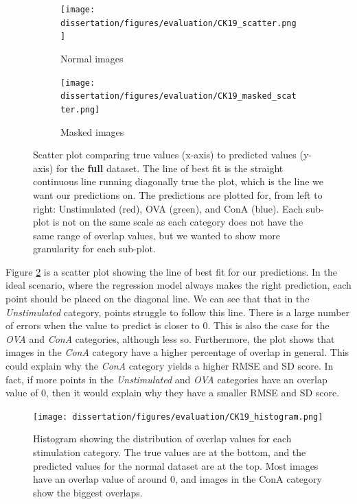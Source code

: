 \begin{figure}[h!]
    \centering
    \begin{subfigure}{.8\textwidth}
        \texttt{[image: dissertation/figures/evaluation/CK19\_scatter.png]}
        \caption{Normal images}
    \end{subfigure}
    \begin{subfigure}{.8\textwidth}
        \texttt{[image: dissertation/figures/evaluation/CK19\_masked\_scatter.png]}
        \caption{Masked images}
        \label{fig:full_masked_scatter}
    \end{subfigure}
    \caption{Scatter plot comparing true values (x-axis) to predicted values (y-axis) for the \textbf{full} dataset. The line of best fit is the straight continuous line running diagonally true the plot, which is the line we want our predictions on. The predictions are plotted for, from left to right: Unstimulated (red), OVA (green), and ConA (blue). Each sub-plot is not on the same scale as each category does not have the same range of overlap values, but we wanted to show more granularity for each sub-plot.}
    \label{fig:full_scatter}
\end{figure}

Figure \ref{fig:full_scatter} is a scatter plot showing the line of best fit for our predictions. In the ideal scenario, where the regression model always makes the right prediction, each point should be placed on the diagonal line. We can see that that in the \textit{Unstimulated} category, points struggle to follow this line. There is a large number of errors when the value to predict is closer to 0. This is also the case for the \textit{OVA} and \textit{ConA} categories, although less so. Furthermore, the plot shows that images in the \textit{ConA} category have a higher percentage of overlap in general. This could explain why the \textit{ConA} category yields a higher RMSE and SD score. In fact, if more points in the \textit{Unstimulated} and \textit{OVA} categories have an overlap value of 0, then it would explain why they have a smaller RMSE and SD score. 

\begin{figure}[h!]
    \centering
    \texttt{[image: dissertation/figures/evaluation/CK19\_histogram.png]}
    \caption{Histogram showing the distribution of overlap values for each stimulation category. The true values are at the bottom, and the predicted values for the normal dataset are at the top. Most images have an overlap value of around 0, and images in the ConA category show the biggest overlaps.}
    \label{fig:full_histogram}
\end{figure}

